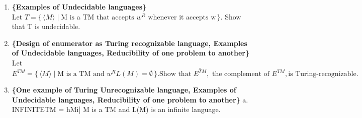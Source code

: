 \documentclass[11pt, article, oneside]{memoir}
\newcommand{\set}[1]{\{\, #1\, \}}
\begin{document}
\begin{enumerate}
    \item
    \textbf{\{Examples of Undecidable languages\}}
    \\Let \(T = \set{\langle M\rangle \mid \text{M is a TM that accepts }w^R \text{ whenever it accepts w}}\). Show that T is undecidable.

    \item
    \textbf{\{Design of enumerator as Turing recognizable language, Examples of Undecidable languages, Reducibility of one problem to another\}}
    \\Let \(E^{TM} = \set{\langle M\rangle \mid \text{M is a TM and }w^R L(M) = \emptyset}. \text{Show that }\bar{E^{TM}}, \text{ the complement of }E^{TM}, \text{is Turing-recognizable.}\)

    \item
    \textbf{\{One example of Turing Unrecognizable language, Examples of Undecidable languages, Reducibility of one problem to another\}}
    a. INFINITETM = {hMi| M is a TM and L(M) is an infinite language}.


\end{enumerate}
\end{document}
